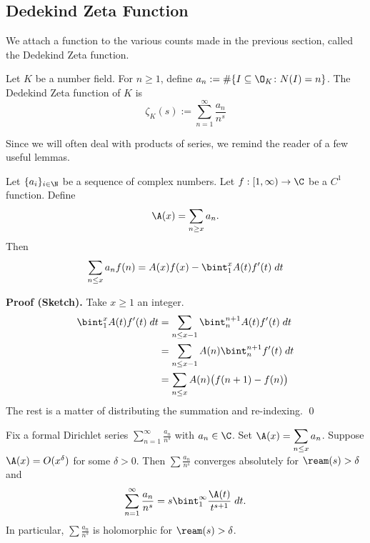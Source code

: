 \subsection{Dedekind Zeta Function}

We attach a function to the various counts made in the previous section, called the Dedekind Zeta function.

\begin{dfn}
Let $K$ be a number field. For $n \geq 1$, define $a_n:= \#\{ I \subseteq \O_K \colon N(I)=n\}$. The Dedekind Zeta function of $K$ is 
	\[
	\zeta_K(s):= \sum_{n=1}^\infty \dfrac{a_n}{n^s}
	\]
\end{dfn}

Since we will often deal with products of series, we remind the reader of a few useful lemmas.

\begin{lem} \label{lem:ps}
Let $\{a_i\}_{i \in \N}$ be a sequence of complex numbers. Let $f: [1,\infty) \to \C$ be a $C^1$ function. Define
	\[
	\A(x)=\sum_{n \geq x} a_n.
	\]
Then 
	\[
	\sum_{n \leq x} a_n f(n) = A(x)f(x) - \bint_1^xA(t) f'(t) \; dt
	\]
\end{lem}

\noindent\textbf{Proof (Sketch). } Take $x \geq 1$ an integer. 
	\[
	\begin{split}
	\bint_1^x A(t) f'(t) \; dt &= \sum_{n \leq x-1} \bint_n^{n+1} A(t) f'(t) \; dt \\
	&= \sum_{n \leq x-1} A(n) \bint_n^{n+1} f'(t) \; dt \\
	&= \sum_{n \leq x} A(n) \big( f(n+1)-f(n) \big)
	\end{split}
	\]
The rest is a matter of distributing the summation and re-indexing. \qed \\


\begin{lem} \label{lem:dirseries}
Fix a formal Dirichlet series $\displaystyle\sum_{n=1}^\infty \frac{a_n}{n^s}$ with $a_n \in \C$. Set $\displaystyle\A(x)= \sum_{n \leq x} a_n$. Suppose $\A(x)= O(x^\delta)$ for some $\delta>0$. Then $\displaystyle\sum \frac{a_n}{n^s}$ converges absolutely for $\ream(s)>\delta$ and 
	\[
	\sum_{n=1}^\infty \frac{a_n}{n^s} = s \bint_1^\infty \dfrac{\A(t)}{t^{s+1}} \; dt.
	\]
In particular, $\displaystyle\sum \frac{a_n}{n^s}$ is holomorphic for $\ream(s)>\delta$.
\end{lem}

